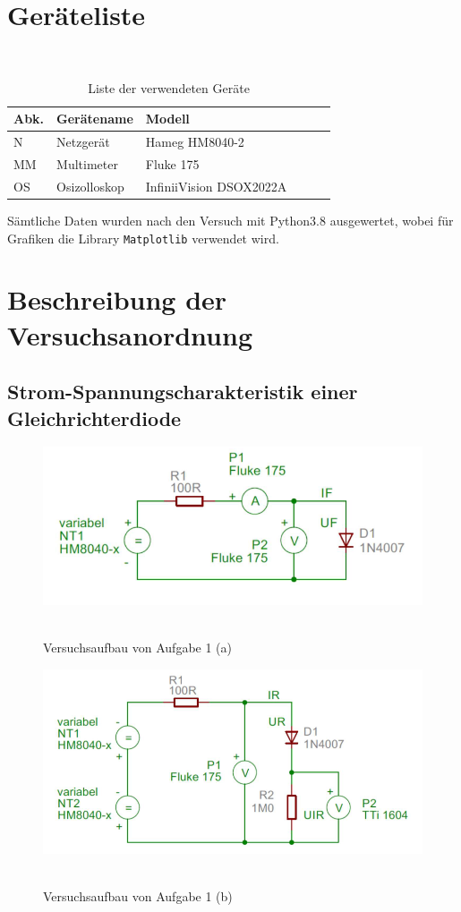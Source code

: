 \documentclass{article}
\begin{document}
\section{Geräteliste}

\begin{table}[H]
\caption{Liste der verwendeten Geräte}

~

\begin{tabular}{l|p{3cm}p{4cm}lll}
Abk. & Gerätename    &  Modell  \\
\hline
N & Netzgerät & Hameg HM8040-2 \\
MM & Multimeter & Fluke 175 \\
OS & Osizolloskop & InfiniiVision DSOX2022A 
\end{tabular}
\end{table}

Sämtliche Daten wurden nach den Versuch mit Python3.8 ausgewertet, wobei für Grafiken die Library \texttt{Matplotlib} verwendet wird. 




\section{Beschreibung der Versuchsanordnung}

\subsection{Strom-Spannungscharakteristik einer Gleichrichterdiode}


\begin{figure}[H]
\caption{Versuchsaufbau von Aufgabe 1 (a)}
\label{fig:aufbau_task1a}
{\centering
\includegraphics[scale=1.7]{bilder/aufbau_task1a.png}
~
}
\end{figure}


\begin{figure}[H]
\caption{Versuchsaufbau von Aufgabe 1 (b)}
\label{fig:aufbau_task1b}
{\centering
\includegraphics[scale=1.7]{bilder/aufbau_task1b.png}
~
}
\end{figure}
\end{document}

